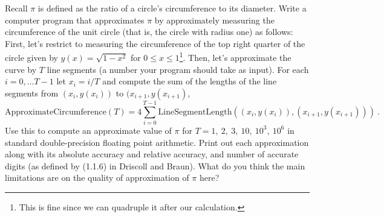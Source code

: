 \documentclass[11pt]{article}
\newenvironment{problem}[2][Question]{\begin{trivlist}
\item[\hskip \labelsep {\bfseries #1}\hskip \labelsep {\bfseries #2.}]}{\end{trivlist}}
\theoremstyle{definition}
\begin{document}
\newpage
\begin{problem}{2}
Recall $\pi$ is defined as the ratio of a circle's circumference to its diameter. Write a computer program that approximates $\pi$ by approximately measuring the circumference of the unit circle (that is, the circle with radius one) as follows:
First, let's restrict to measuring the circumference of the top right quarter of the circle given by $y(x) = \sqrt{1-x^2}$ for $0\leq x\leq 1$\footnote{This is fine since we can quadruple it after our calculation.}. Then, let's approximate the curve by $T$ line segments (a number your program should take as input). For each $i=0,\dots T-1$ let $x_i = i/T$ and compute the sum of the lengths of the line segments from $(x_i,y(x_i))$ to $(x_{i+1},y(x_{i+1})$,
$$ \mathrm{ApproximateCircumference}(T) = 4\sum_{i=0}^{T-1} \mathrm{LineSegmentLength}((x_i,y(x_i)),(x_{i+1},y(x_{i+1}))) \ . $$
Use this to compute an approximate value of $\pi$ for $T=1,\ 2,\ 3, \ 10,\ 10^3,\ 10^6$ in standard double-precision floating point arithmetic. Print out each approximation along with its absolute accuracy and relative accuracy, and number of accurate digits (as defined by (1.1.6) in Driscoll and Braun). What do you think the main limitations are on the quality of approximation of $\pi$ here?
\end{problem}
\end{document}
